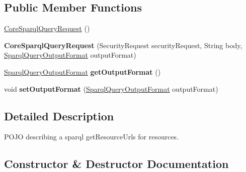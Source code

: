 \subsection*{Public Member Functions}
\begin{DoxyCompactItemize}
\item 
\hyperlink{classeu_1_1h2020_1_1symbiote_1_1core_1_1internal_1_1CoreSparqlQueryRequest_a855c39c53d50de118f4df279eb2b01f3}{Core\+Sparql\+Query\+Request} ()
\item 
\mbox{\label{classeu_1_1h2020_1_1symbiote_1_1core_1_1internal_1_1CoreSparqlQueryRequest_a1ec6fc4aa53970880f0e37cb2bded9d4}} 
{\bfseries Core\+Sparql\+Query\+Request} (Security\+Request security\+Request, String body, \hyperlink{enumeu_1_1h2020_1_1symbiote_1_1core_1_1ci_1_1SparqlQueryOutputFormat}{Sparql\+Query\+Output\+Format} output\+Format)
\item 
\mbox{\label{classeu_1_1h2020_1_1symbiote_1_1core_1_1internal_1_1CoreSparqlQueryRequest_a6dea88c23c51a92340e6344cce3fabd0}} 
\hyperlink{enumeu_1_1h2020_1_1symbiote_1_1core_1_1ci_1_1SparqlQueryOutputFormat}{Sparql\+Query\+Output\+Format} {\bfseries get\+Output\+Format} ()
\item 
\mbox{\label{classeu_1_1h2020_1_1symbiote_1_1core_1_1internal_1_1CoreSparqlQueryRequest_a8cacb1ea4211122d5297922f050400ae}} 
void {\bfseries set\+Output\+Format} (\hyperlink{enumeu_1_1h2020_1_1symbiote_1_1core_1_1ci_1_1SparqlQueryOutputFormat}{Sparql\+Query\+Output\+Format} output\+Format)
\end{DoxyCompactItemize}


\subsection{Detailed Description}
P\+O\+JO describing a sparql get\+Resource\+Urls for resources. 

\subsection{Constructor \& Destructor Documentation}
\mbox{\label{classeu_1_1h2020_1_1symbiote_1_1core_1_1internal_1_1CoreSparqlQueryRequest_a855c39c53d50de118f4df279eb2b01f3}} 
